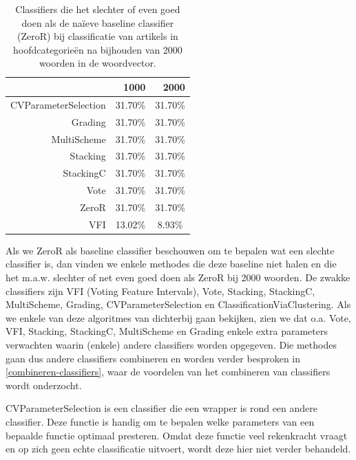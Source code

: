 \begin{table}[htbp]
	\centering
	\caption{Classifiers die het slechter of even goed doen als de na\"ieve baseline classifier (ZeroR) bij classificatie van artikels in hoofdcategorie\"en na bijhouden van 2000 woorden in de woordvector.}
	\begin{tabular}{rrr}
		\toprule
		& 1000  & 2000 \\
		\midrule
		CVParameterSelection & \multicolumn{1}{c}{31.70\%} & \multicolumn{1}{c}{31.70\%} \\
		Grading & \multicolumn{1}{c}{31.70\%} & \multicolumn{1}{c}{31.70\%} \\
		MultiScheme & \multicolumn{1}{c}{31.70\%} & \multicolumn{1}{c}{31.70\%} \\
		Stacking & \multicolumn{1}{c}{31.70\%} & \multicolumn{1}{c}{31.70\%} \\
		StackingC & \multicolumn{1}{c}{31.70\%} & \multicolumn{1}{c}{31.70\%} \\
		Vote  & \multicolumn{1}{c}{31.70\%} & \multicolumn{1}{c}{31.70\%} \\
		ZeroR & \multicolumn{1}{c}{31.70\%} & \multicolumn{1}{c}{31.70\%} \\
		VFI   & \multicolumn{1}{c}{13.02\%} & \multicolumn{1}{c}{8.93\%} \\
		\bottomrule
	\end{tabular}%
	\label{tab:naive-classifiers}%
\end{table}

Als we ZeroR als baseline classifier beschouwen om te bepalen wat een slechte classifier is, dan vinden we enkele methodes die deze baseline niet halen en die het m.a.w. slechter of net even goed doen als ZeroR bij 2000 woorden. De zwakke classifiers zijn VFI (Voting Feature Intervals), Vote, Stacking, StackingC, MultiScheme, Grading, CVParameterSelection en ClassificationViaClustering. Als we enkele van deze algoritmes van dichterbij gaan bekijken, zien we dat o.a. Vote, VFI, Stacking, StackingC, MultiScheme en Grading enkele extra parameters verwachten waarin (enkele) andere classifiers worden opgegeven. Die methodes gaan dus andere classifiers combineren en worden verder besproken in \ref{combineren-classifiers}, waar de voordelen van het combineren van classifiers wordt onderzocht. 

CVParameterSelection is een classifier die een wrapper is rond een andere classifier. Deze functie is handig om te bepalen welke parameters van een bepaalde functie optimaal presteren. Omdat deze functie veel rekenkracht vraagt en op zich geen echte classificatie uitvoert, wordt deze hier niet verder behandeld. 

